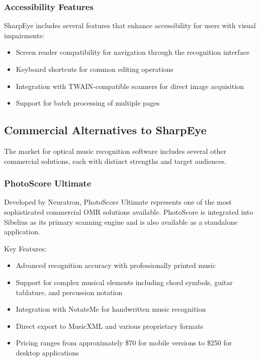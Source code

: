 \subsubsection{Accessibility Features}
SharpEye includes several features that enhance accessibility for users with visual impairments:
\begin{itemize}
    \item Screen reader compatibility for navigation through the recognition interface
    \item Keyboard shortcuts for common editing operations
    \item Integration with TWAIN-compatible scanners for direct image acquisition
    \item Support for batch processing of multiple pages
\end{itemize}

\subsection{Commercial Alternatives to SharpEye}

The market for optical music recognition software includes several other commercial solutions, each with distinct strengths and target audiences.

\subsubsection{PhotoScore Ultimate}
Developed by Neuratron, PhotoScore Ultimate represents one of the most sophisticated commercial OMR solutions available. PhotoScore is integrated into Sibelius as its primary scanning engine and is also available as a standalone application.

Key Features:
\begin{itemize}
    \item Advanced recognition accuracy with professionally printed music
    \item Support for complex musical elements including chord symbols, guitar tablature, and percussion notation
    \item Integration with NotateMe for handwritten music recognition
    \item Direct export to MusicXML and various proprietary formats
    \item Pricing ranges from approximately \$70 for mobile versions to \$250 for desktop applications
\end{itemize}

